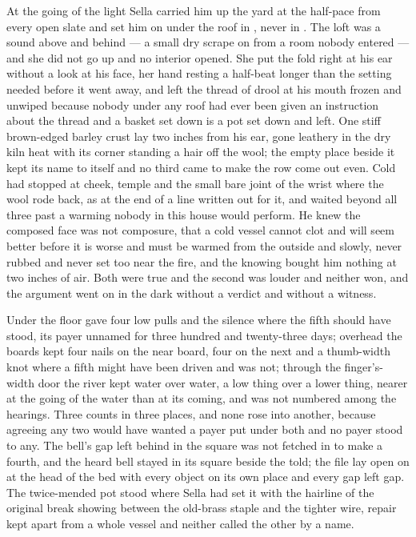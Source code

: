 \scenebreak

At the going of the light Sella carried him up the yard at the half-pace from every open slate and set him on  under the roof in , never in . The loft was a sound above and behind --- a small dry scrape on  from a room nobody entered --- and she did not go up and no interior opened. She put the fold right at his ear without a look at his face, her hand resting a half-beat longer than the setting needed before it went away, and left the thread of drool at his mouth frozen and unwiped because nobody under any roof had ever been given an instruction about the thread and a basket set down is a pot set down and left. One stiff brown-edged barley crust lay two inches from his ear, gone leathery in the dry kiln heat with its corner standing a hair off the wool; the empty place beside it kept its name to itself and no third came to make the row come out even. Cold had stopped at cheek, temple and the small bare joint of the wrist where the wool rode back, as at the end of a line written out for it, and  waited beyond all three past a warming nobody in this house would perform. He knew the composed face was not composure, that a cold vessel cannot clot and will seem better before it is worse and must be warmed from the outside and slowly, never rubbed and never set too near the fire, and the knowing bought him nothing at two inches of air. Both were true and the second was louder and neither won, and the argument went on in the dark without a verdict and without a witness.

Under the floor  gave four low pulls and the silence where the fifth should have stood, its payer unnamed for three hundred and twenty-three days; overhead the boards kept four nails on the near board, four on the next and a thumb-width knot where a fifth might have been driven and was not; through the finger's-width door the river kept water over water, a low thing over a lower thing, nearer at the going of the water than at its coming, and was not numbered among the hearings. Three counts in three places, and none rose into another, because agreeing any two would have wanted a payer put under both and no payer stood to any. The bell's gap left behind in the square was not fetched in to make a fourth, and the heard bell stayed in its square beside the told; the file lay open on  at the head of the bed with every object on its own place and every gap left gap. The twice-mended pot stood where Sella had set it with the hairline of the original break showing between the old-brass staple and the tighter wire, repair kept apart from a whole vessel and neither called the other by a name.

